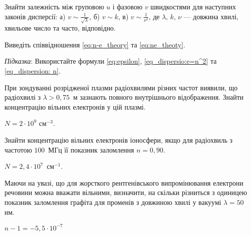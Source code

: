 \begin{problem}%
Знайти залежність між груповою $u$ і фазовою $v$ швидкостями для
наступних законів дисперсії: а) $v \sim \frac{1}{\sqrt{\lambda}}$, б) $v \sim k$, в) $v \sim \frac1{\nu^2}$,
де $\lambda$, $k$, $\nu$ --- довжина хвилі, хвильове число та часто, відповідно.
\end{problem}


\begin{problem}%
Виведіть співвідношення \eqref{eq:n-e_theory} та \eqref{eq:ne_theoty}.
\begin{solution}
	\emph{Підказка}: Використайте формули \eqref{eq:epsilon}, \eqref{eq_dispersio:e=n^2} та \eqref{eq_dispersion: n}.
\end{solution}
\end{problem}

\begin{problem}%
При зондуванні розрідженої плазми радіохвилями різних частот
виявили, що радіохвилі з $\lambda > 0,75$~м зазнають повного внутрішнього
відображення. Знайти концентрацію вільних електронів у цій плазмі.
\begin{solution}
	$N = 2\cdot10^9$ см$^{-3}$.
\end{solution}
\end{problem}


\begin{problem}%
Знайти концентрацію вільних електронів іоносфери, якщо для
радіохвиль з частотою $100$~МГц її показник заломлення $n=0,90$.
\begin{solution}
	$N = 2,4\cdot10^7$~см$^{-1}$.
\end{solution}
\end{problem}



\begin{problem}%
Маючи на увазі, що для жорсткого рентгенівського випромінювання
електрони речовини можна вважати вільними, визначити, на скільки
різниться з одиницею показник заломлення графіта для променів з
довжиною хвилі у вакуумі $\lambda=50$ нм.
\begin{solution}
	$n - 1 = - 5,5\cdot10^{-7}$
\end{solution}
\end{problem}




